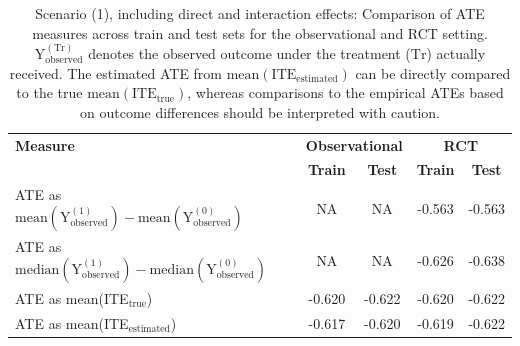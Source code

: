 

\begin{table}[htbp]
\centering
\small
\caption{Scenario (1), including direct and interaction effects: Comparison of ATE measures across train and test sets for the observational and RCT setting. $\text{Y}_\text{observed}^{(\text{Tr})}$ denotes the observed outcome under the treatment ($\text{Tr}$) actually received. The estimated ATE from $\text{mean}(\text{ITE}_\text{estimated})$ can be directly compared to the true $\text{mean}(\text{ITE}_\text{true})$, whereas comparisons to the empirical ATEs based on outcome differences should be interpreted with caution.}
\label{tab:scenario1_ate_comparison}
\begin{tabular}{l c c c c}
\toprule
\textbf{Measure} & \multicolumn{2}{c}{\textbf{Observational}} & \multicolumn{2}{c}{\textbf{RCT}} \\
\cmidrule(lr){2-3} \cmidrule(lr){4-5}
 & \textbf{Train} & \textbf{Test} & \textbf{Train} & \textbf{Test} \\
\midrule
ATE as $\text{mean}(\text{Y}_\text{observed}^{(1)}) - \text{mean}(\text{Y}_\text{observed}^{(0)})$ 
& NA & NA 
& -0.563 
& -0.563 \\

ATE as $\text{median}(\text{Y}_\text{observed}^{(1)}) - \text{median}(\text{Y}_\text{observed}^{(0)})$  
& NA & NA 
& -0.626 
& -0.638 \\

ATE as mean(ITE$_\text{true}$)  
& -0.620 
& -0.622 
& -0.620 
& -0.622 \\

ATE as mean(ITE$_\text{estimated}$) 
& -0.617 
& -0.620 
& -0.619 
& -0.622 \\
\bottomrule
\end{tabular}
\end{table}

